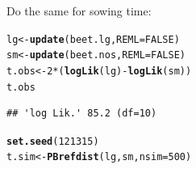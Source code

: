 \documentclass[compress]{beamer}\usepackage[]{graphicx}\usepackage[]{color}
\makeatletter
\newcommand{\hlnum}[1]{\textcolor[rgb]{0.686,0.059,0.569}{#1}}%
\newcommand{\hlopt}[1]{\textcolor[rgb]{0,0,0}{#1}}%
\newcommand{\hlstd}[1]{\textcolor[rgb]{0.345,0.345,0.345}{#1}}%
\newcommand{\hlkwb}[1]{\textcolor[rgb]{0.69,0.353,0.396}{#1}}%
\newcommand{\hlkwc}[1]{\textcolor[rgb]{0.333,0.667,0.333}{#1}}%
\newcommand{\hlkwd}[1]{\textcolor[rgb]{0.737,0.353,0.396}{\textbf{#1}}}%
\newenvironment{kframe}{%
 \def\at@end@of@kframe{}%
 \ifinner\ifhmode%
  \def\at@end@of@kframe{\end{minipage}}%
  \begin{minipage}{\columnwidth}%
 \fi\fi%
 \def\FrameCommand##1{\hskip\@totalleftmargin \hskip-\fboxsep
 \colorbox{shadecolor}{##1}\hskip-\fboxsep
     \hskip-\linewidth \hskip-\@totalleftmargin \hskip\columnwidth}%
 \MakeFramed {\advance\hsize-\width
   \@totalleftmargin\z@ \linewidth\hsize
   \@setminipage}}%
 {\par\unskip\endMakeFramed%
 \at@end@of@kframe}
\newenvironment{knitrout}{}{} %
\newenvironment{sframe}
{\begin{frame} [containsverbatim] }
  {\end{frame}}
\makeatother
\begin{document}
\begin{sframe}
Do the same for sowing time:

\begin{knitrout}\scriptsize
{}\color{fgcolor}\begin{kframe}
\begin{alltt}
\hlstd{lg} \hlkwb{<-} \hlkwd{update}\hlstd{(beet.lg,} \hlkwc{REML}\hlstd{=}\hlnum{FALSE}\hlstd{)}
\hlstd{sm} \hlkwb{<-} \hlkwd{update}\hlstd{(beet.nos,} \hlkwc{REML}\hlstd{=}\hlnum{FALSE}\hlstd{)}
\hlstd{t.obs} \hlkwb{<-} \hlnum{2}\hlopt{*}\hlstd{(}\hlkwd{logLik}\hlstd{(lg)}\hlopt{-}\hlkwd{logLik}\hlstd{(sm))}
\hlstd{t.obs}
\end{alltt}
\begin{verbatim}
## 'log Lik.' 85.2 (df=10)
\end{verbatim}
\end{kframe}
\end{knitrout}


\begin{knitrout}\scriptsize
{}\color{fgcolor}\begin{kframe}
\begin{alltt}
\hlkwd{set.seed}\hlstd{(}\hlnum{121315}\hlstd{)}
\hlstd{t.sim} \hlkwb{<-} \hlkwd{PBrefdist}\hlstd{(lg, sm,} \hlkwc{nsim}\hlstd{=}\hlnum{500}\hlstd{)}
\end{alltt}
\end{kframe}
\end{knitrout}

  
\end{sframe}
\end{document}
